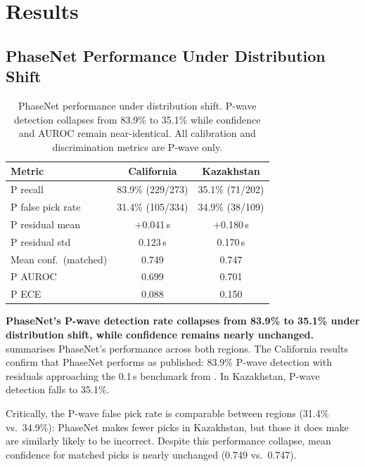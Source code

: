 \section{Results}
\label{sec:results}
\vspace{2mm}

\subsection{PhaseNet Performance Under Distribution Shift}
\label{sec:shift}

\begin{table}[t]
    \centering
    \caption{PhaseNet performance under distribution shift. P-wave detection collapses from 83.9\% to 35.1\% while confidence and AUROC remain near-identical. All calibration and discrimination metrics are P-wave only.}
    \label{tab:shift}
    \small
    \begin{tabular}{@{}lcc@{}}
        \toprule
        Metric & California & Kazakhstan \\
        \midrule
        P recall & 83.9\% (229/273) & 35.1\% (71/202) \\
        P false pick rate & 31.4\% (105/334) & 34.9\% (38/109) \\
        P residual mean & +0.041\,s & +0.180\,s \\
        P residual std & 0.123\,s & 0.170\,s \\
        Mean conf.\ (matched) & 0.749 & 0.747 \\
        P AUROC & 0.699 & 0.701 \\
        P ECE & 0.088 & 0.150 \\
        \bottomrule
    \end{tabular}
\end{table}

\textbf{PhaseNet's P-wave detection rate collapses from 83.9\% to 35.1\% under distribution shift, while confidence remains nearly unchanged.}  summarises PhaseNet's performance across both regions. The California results confirm that PhaseNet performs as published: 83.9\% P-wave detection with residuals approaching the 0.1\,s benchmark from \citet{zhu2019phasenet}. In Kazakhstan, P-wave detection falls to 35.1\%.

\medskip
Critically, the P-wave false pick rate is comparable between regions (31.4\% vs.\ 34.9\%): PhaseNet makes fewer picks in Kazakhstan, but those it does make are similarly likely to be incorrect. Despite this performance collapse, mean confidence for matched picks is nearly unchanged (0.749 vs.\ 0.747).

